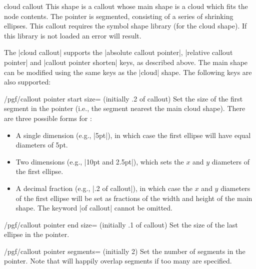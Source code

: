 \begin{shape}{cloud callout}
This shape is a callout whose main shape is a cloud which fits the 
node contents. The pointer is segmented, consisting of a series of 
shrinking ellipses. This callout requires the symbol shape library 
(for the cloud shape). If this library is not loaded an error will 
result.

\begin{codeexample}[]
\end{codeexample}

The |cloud callout| supports the |absolute callout pointer|,
|relative callout pointer| and |callout pointer shorten| keys, as 
described above.
The main shape can be modified using the same keys as the |cloud| 
shape. The following keys are also supported:

\begin{key}{/pgf/callout pointer start size= (initially .2 of callout)}
	Set the size of the first segment in the pointer (i.e., the segment
	nearest the main cloud shape). There are three possible forms for
	:
	\begin{itemize}
		\item
			A single dimension (e.g., |5pt|), in which case the first ellipse 
			will have equal diameters of 5pt.
		\item
			Two dimensions (e.g., |10pt and 2.5pt|), which sets the $x$ and 
			$y$ diameters of the first ellipse.
		\item
			A decimal fraction (e.g., |.2 of callout|), in which case
			the $x$ and $y$ diameters of the first ellipse will be set as 
			fractions of the width and height of the main shape. The keyword
			|of callout| cannot be omitted.	
	\end{itemize}
\end{key}

\begin{key}{/pgf/callout pointer end size= (initially .1 of callout)}
	Set the size of the last ellipse in the pointer.
\end{key}

\begin{key}{/pgf/callout pointer segments= (initially 2)}
	Set the number of segments in the pointer. Note that \pgfname{} will 
	happily	overlap segments if too many are specified. 
\end{key}


\end{shape}
